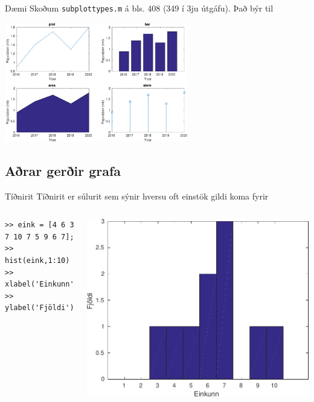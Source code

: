 \documentclass{beamer}
\begin{document}
\begin{frame}{Dæmi}
\vspace{1cm}
Skoðum \texttt{subplottypes.m} á bls. 408 (349 í 3ju útgáfu). Það býr til

\begin{center}
\includegraphics[width=0.6\textwidth]{Pics/plottypes.pdf}
\end{center}
\end{frame}

\subsection{Aðrar gerðir grafa}

\begin{frame}[fragile]{Tíðnirit}
Tíðnirit er súlurit sem sýnir hversu oft einstök gildi koma fyrir
\begin{columns}
\begin{verbatim}
>> eink = [4 6 3 7 10 7 5 9 6 7];
>> hist(eink,1:10)
>> xlabel('Einkunn')
>> ylabel('Fjöldi')
\end{verbatim}

\includegraphics[width=\linewidth]{Pics/hist}
\end{columns}

\end{frame}
\end{document}
